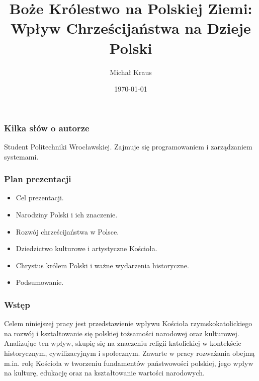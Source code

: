 \documentclass{beamer}
\title{Boże Królestwo na Polskiej Ziemi: Wpływ Chrześcijaństwa na Dzieje Polski}
\author{Michał Kraus}
\date{\today}
\begin{document}
\begin{frame}
    \titlepage
\end{frame}

\begin{frame}
    \frametitle{Kilka słów o autorze}
    
        Student Politechniki Wrocławskiej.
        Zajmuje się programowaniem i zarządzaniem systemami.
\end{frame}

\begin{frame}
    \frametitle{Plan prezentacji}
    \begin{itemize}
        \item Cel prezentacji.
        \item Narodziny Polski i ich znaczenie.
        \item Rozwój chrześcijaństwa w Polsce.
        \item Dziedzictwo kulturowe i artystyczne Kościoła.
        \item Chrystus królem Polski i ważne wydarzenia historyczne.
        \item Podsumowanie.
    \end{itemize}
\end{frame}

\begin{frame}
    \frametitle{Wstęp}
    Celem niniejszej pracy jest przedstawienie wpływu Kościoła rzymskokatolickiego na rozwój i kształtowanie się polskiej tożsamości 
    narodowej oraz kulturowej. Analizując ten wpływ, skupię się na znaczeniu religii katolickiej w kontekście historycznym, cywilizacyjnym i społecznym. 
    Zawarte w pracy rozważania obejmą m.in. rolę Kościoła w tworzeniu fundamentów państwowości polskiej, jego wpływ na kulturę, edukację oraz na kształtowanie 
    wartości narodowych.
\end{frame}
\end{document}
